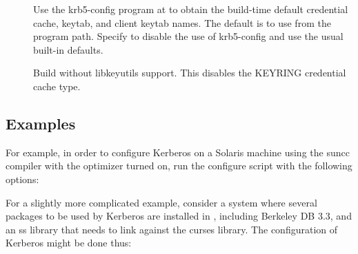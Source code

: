 \documentclass[letterpaper,10pt,english]{sphinxmanual}
\begin{document}
\begin{description}
\item[{\sphinxstylestrong{-}}] \leavevmode
Use the krb5-config program at  to obtain the build-time
default credential cache, keytab, and client keytab names.  The
default is to use  from the program path.  Specify
 to disable the use of krb5-config and
use the usual built-in defaults.

\item[{\sphinxstylestrong{-}}] \leavevmode
Build without libkeyutils support.  This disables the KEYRING
credential cache type.

\end{description}


\subsection{Examples}
\label{\detokenize{build/options2configure:examples}}
For example, in order to configure Kerberos on a Solaris machine using
the suncc compiler with the optimizer turned on, run the configure
script with the following options:

%
\begin{sphinxVerbatim}[commandchars=\\\{\}]
   
\end{sphinxVerbatim}

For a slightly more complicated example, consider a system where
several packages to be used by Kerberos are installed in
, including Berkeley DB 3.3, and an ss library that
needs to link against the curses library.  The configuration of
Kerberos might be done thus:

%
\begin{sphinxVerbatim}[commandchars=\\\{\}]
   \PYGZbs{}
    \PYGZbs{}
   
\end{sphinxVerbatim}
\end{document}
